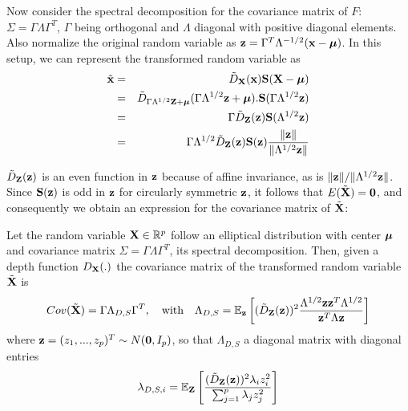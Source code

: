 \documentclass[10pt]{book}
\begin{document}
Now consider the spectral decomposition for the covariance matrix of $F$: $\Sigma = \Gamma\Lambda\Gamma^T$, $\Gamma$ being orthogonal and $\Lambda$ diagonal with positive diagonal elements. Also normalize the original random variable as ${\bf{z}} = \Gamma^T\Lambda^{-1/2} ({\bf{x}} - {\boldsymbol{\mu}})$. In this setup, we can represent the transformed random variable as
%
\begin{eqnarray}
\tilde {{\bf{x}}} &=& \tilde D_{{\mathbf{X}}} ({\bf{x}}) {\mathbf{S}}({\mathbf{X}} - {\boldsymbol{\mu}}) \notag \\
&=& \tilde D_{\Gamma\Lambda^{1/2}{\mathbf{Z}} + {\boldsymbol{\mu}}} (\Gamma\Lambda^{1/2} {\bf{z}} + {\boldsymbol{\mu}}). {\mathbf{S}}(\Gamma\Lambda^{1/2} {\bf{z}}) \notag \\
&=& \Gamma \tilde D_{{\mathbf{Z}}}({\bf{z}}) {\mathbf{S}}(\Lambda^{1/2}{\bf{z}}) \notag \\
&=& \Gamma \Lambda^{1/2} \tilde D_{{\mathbf{Z}}}({\bf{z}}) {\mathbf{S}}({\bf{z}}) \frac{\| {\bf{z}} \|}{\|\Lambda^{1/2} {\bf{z}}\|}
\label{equation:rankdecomp}
\end{eqnarray}
%

$\tilde D_{\mathbf{Z}}({\bf{z}})$ is an even function in ${\bf{z}}$ because of affine invariance, as is $\| {\bf{z}} \| / \|\Lambda^{1/2} {\bf{z}} \|$. Since ${\mathbf{S}}({\bf{z}})$ is odd in ${\bf{z}}$ for circularly symmetric ${\bf{z}}$, it follows that $E(\tilde {{\mathbf{X}}}) = \bf0$, and consequently we obtain an expression for the covariance matrix of $\tilde {{\mathbf{X}}}$:

\begin{Theorem} \label{Theorem:covform}
Let the random variable ${\mathbf{X}} \in \mathbb{R}^p$ follow an elliptical distribution with center ${\boldsymbol{\mu}}$ and covariance matrix $\Sigma = \Gamma\Lambda\Gamma^T$, its spectral decomposition. Then, given a depth function $D_{\mathbf{X}}(.)$ the covariance matrix of the transformed random variable $\tilde{{\mathbf{X}}}$ is
\begin{equation} \label{equation:covformEq1}
Cov(\tilde {{\mathbf{X}}}) = \Gamma \Lambda_{D,S} \Gamma^T,\quad\mbox{with}\quad \Lambda_{D,S} = \mathbb E_{\bf{z}} \left[ (\tilde D_{\mathbf{Z}}({\bf{z}}))^2 \frac{\Lambda^{1/2} {\bf{z}} {\bf{z}}^T \Lambda^{1/2}}{{\bf{z}}^T \Lambda {\bf{z}}} \right]
\end{equation}
where ${\bf{z}} = (z_1,...,z_p)^T \sim N({\bf 0}, I_p)$, so that $\Lambda_{D,S}$ a diagonal matrix with diagonal entries
%
$$ \lambda_{D,S,i} = \mathbb E_{\mathbf{Z}} \left[ \frac{(\tilde D_{\mathbf{Z}}({\bf{z}}))^2 \lambda_i z_i^2}{\sum_{j=1}^p \lambda_j z_j^2} \right] $$
\end{Theorem}
\end{document}
